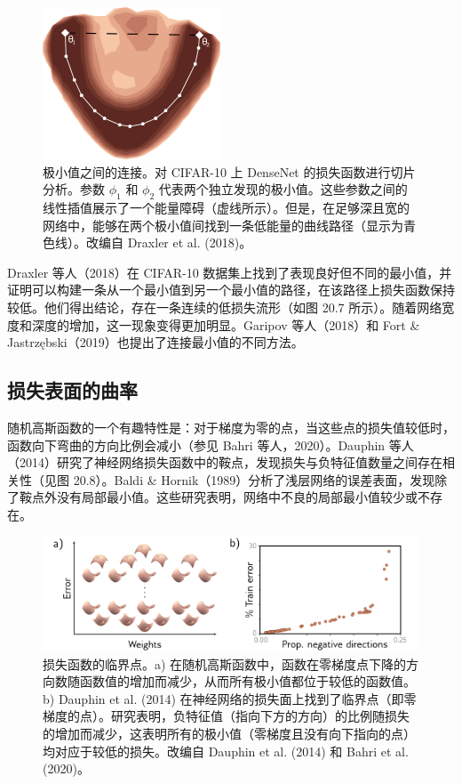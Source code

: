 \begin{figure}[ht!]
\centering
\includegraphics[width=0.7\linewidth]{png/chapter20/WhyDraxler.png}
\caption{极小值之间的连接。对 CIFAR-10 上 DenseNet 的损失函数进行切片分析。参数 \(\phi_1\) 和 \(\phi_2\) 代表两个独立发现的极小值。这些参数之间的线性插值展示了一个能量障碍（虚线所示）。但是，在足够深且宽的网络中，能够在两个极小值间找到一条低能量的曲线路径（显示为青色线）。改编自 Draxler et al. (2018)。}
\end{figure}

Draxler 等人（2018）在 CIFAR-10 数据集上找到了表现良好但不同的最小值，并证明可以构建一条从一个最小值到另一个最小值的路径，在该路径上损失函数保持较低。他们得出结论，存在一条连续的低损失流形（如图 20.7 所示）。随着网络宽度和深度的增加，这一现象变得更加明显。Garipov 等人（2018）和 Fort \& Jastrzębski（2019）也提出了连接最小值的不同方法。

\subsection{损失表面的曲率}
随机高斯函数的一个有趣特性是：对于梯度为零的点，当这些点的损失值较低时，函数向下弯曲的方向比例会减小（参见 Bahri 等人，2020）。Dauphin 等人（2014）研究了神经网络损失函数中的鞍点，发现损失与负特征值数量之间存在相关性（见图 20.8）。Baldi \& Hornik（1989）分析了浅层网络的误差表面，发现除了鞍点外没有局部最小值。这些研究表明，网络中不良的局部最小值较少或不存在。

\begin{figure}[ht!]
\centering
\includegraphics[width=0.7\linewidth]{png/chapter20/WhyDauphin.png}
\caption{损失函数的临界点。a) 在随机高斯函数中，函数在零梯度点下降的方向数随函数值的增加而减少，从而所有极小值都位于较低的函数值。b) Dauphin et al. (2014) 在神经网络的损失面上找到了临界点（即零梯度的点）。研究表明，负特征值（指向下方的方向）的比例随损失的增加而减少，这表明所有的极小值（零梯度且没有向下指向的点）均对应于较低的损失。改编自 Dauphin et al. (2014) 和 Bahri et al. (2020)。}
\end{figure}

